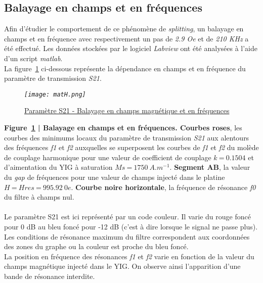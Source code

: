 \documentclass[12pt,fleqn]{book} %
\begin{document}
\subsection{Balayage en champs et en fréquences}
\noindent Afin d'étudier le comportement de ce phénomène de \emph{splitting}, un balayage en champs et en fréquence avec respectivement un pas de \emph{2.9 Oe} et de \emph{210 KHz} a été effectué. Les données stockées par le logiciel \emph{Labview} ont été analysées à l'aide d'un script \emph{matlab}.
~\\La figure~\underline{\color{blue}\ref{matH}} ci-dessous représente la dépendance en champs et en fréquence du paramètre de transmission \emph{S21}.
\begin{figure}[H]
	\centering
	\itshape
	\texttt{[image: matH.png]}
	\caption{\label{matH} \underline{Paramètre S21 - Balayage en champs magnétique et en fréquences}}
\end{figure}
\noindent\footnotesize\textbf{Figure~\underline{\color{blue}\ref{matH}} | Balayage en champs et en fréquences. Courbes roses}, les courbes des minimums locaux du paramètre de transmission \emph{S21} aux alentours des fréquences \emph{f1} et \emph{f2} auxquelles se superposent les courbes de \emph{f1} et \emph{f2} du molède de couplage harmonique pour une valeur de coefficient de couplage $k\ \text{=}\ 0.1504$ et d'aimentation du YIG à saturation $Ms\ \text{=}\ 1750\ A.m^{-1}$. \textbf{Segment AB}, la valeur du \emph{gap} de fréquences pour une valeur de champs injecté dans le platine $H\ \text{=}\ Hres\ \text{=}\ 995.92\ 0e$. \textbf{Courbe noire horizontale}, la fréquence de résonance \emph{f0} du filtre à champs nul.
~\\\\
\normalsize
\noindent Le paramètre S21 est ici représenté par un code couleur. Il varie du rouge foncé pour 0 dB au bleu foncé pour -12 dB (c'est à dire lorsque le signal ne passe plus). Les conditions de résonance maximum du filtre correspondent aux coordonnées des zones du graphe ou la couleur est proche du bleu foncé.
~\\La position en fréquence des résonances \emph{f1} et \emph{f2} varie en fonction de la valeur du champs magnétique injecté dans le YIG. On observe ainsi l'apparition d'une bande de résonance interdite.
\end{document}
